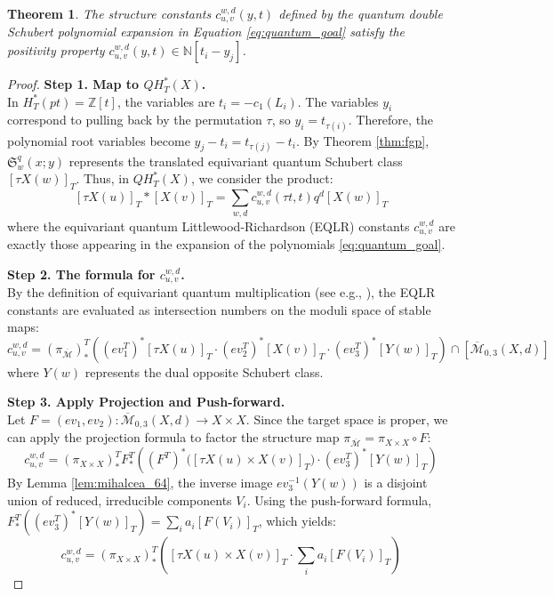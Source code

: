 \documentclass{amsart}
\newtheorem{theorem}{Theorem}[section]
\theoremstyle{definition}
\begin{document}
\begin{theorem}\label{thm:main_claim}
The structure constants $c_{u,v}^{w,d}(y,t)$ defined by the quantum double Schubert polynomial expansion in Equation \eqref{eq:quantum_goal} satisfy the positivity property $c_{u,v}^{w,d}(y,t) \in \mathbb{N}[t_i - y_j]$.
\end{theorem}

\begin{proof}
\noindent \textbf{Step 1. Map to $QH_T^*(X)$.}\\
In $H_T^*(pt) = \mathbb{Z}[t]$, the variables are $t_i = -c_1(L_i)$. The variables $y_i$ correspond to pulling back by the permutation $\tau$, so $y_i = t_{\tau(i)}$. Therefore, the polynomial root variables become $y_j - t_i = t_{\tau(j)} - t_i$. 
By Theorem \ref{thm:fgp}, $\mathfrak{S}_w^q(x;y)$ represents the translated equivariant quantum Schubert class $[\tau X(w)]_T$. Thus, in $QH_T^*(X)$, we consider the product:
\begin{equation}\label{eq:eqlr_expansion}
[\tau X(u)]_T * [X(v)]_T = \sum_{w,d} c_{u,v}^{w,d}(\tau t, t) q^d [X(w)]_T
\end{equation}
where the equivariant quantum Littlewood-Richardson (EQLR) constants $c_{u,v}^{w,d}$ are exactly those appearing in the expansion of the polynomials \eqref{eq:quantum_goal}.

\vspace{2mm}
\noindent \textbf{Step 2. The formula for $c_{u,v}^{w,d}$.}\\
By the definition of equivariant quantum multiplication (see e.g., \cite{Mihalcea2006}), the EQLR constants are evaluated as intersection numbers on the moduli space of stable maps:
\begin{equation}\label{eq:gw_invariant}
c_{u,v}^{w,d} = (\pi_{\overline{\mathcal{M}}})_*^T \left( (ev_1^T)^*[\tau X(u)]_T \cdot (ev_2^T)^*[X(v)]_T \cdot (ev_3^T)^*[Y(w)]_T \right) \cap [\overline{\mathcal{M}}_{0,3}(X,d)] 
\end{equation}
where $Y(w)$ represents the dual opposite Schubert class.

\vspace{2mm}
\noindent \textbf{Step 3. Apply Projection and Push-forward.}\\
Let $F = (ev_1, ev_2) : \overline{\mathcal{M}}_{0,3}(X,d) \to X \times X$. Since the target space is proper, we can apply the projection formula to factor the structure map $\pi_{\overline{\mathcal{M}}} = \pi_{X \times X} \circ F$:
\begin{equation}\label{eq:projection_step}
c_{u,v}^{w,d} = (\pi_{X \times X})_*^T F_*^T \left( (F^T)^*\big([\tau X(u) \times X(v)]_T\big) \cdot (ev_3^T)^*[Y(w)]_T \right) 
\end{equation}
By Lemma \ref{lem:mihalcea_64}, the inverse image $ev_3^{-1}(Y(w))$ is a disjoint union of reduced, irreducible components $V_i$. Using the push-forward formula, $F_*^T((ev_3^T)^*[Y(w)]_T) = \sum_i a_i [F(V_i)]_T$, which yields:
\begin{equation}\label{eq:reduced_c}
c_{u,v}^{w,d} = (\pi_{X \times X})_*^T \left( [\tau X(u) \times X(v)]_T \cdot \sum_i a_i [F(V_i)]_T \right) 
\end{equation}


\end{proof}
\end{document}

